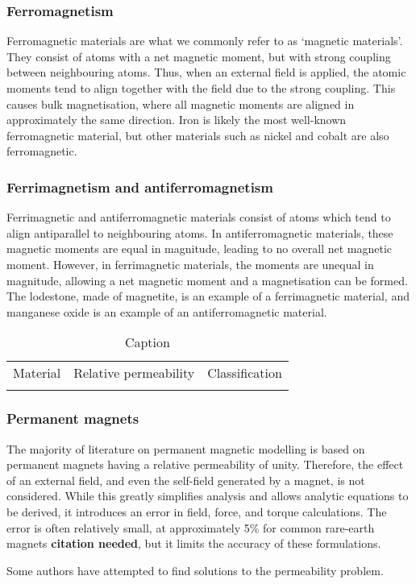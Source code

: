 \subsubsection*{Ferromagnetism}
Ferromagnetic materials are what we commonly refer to as `magnetic materials'. They consist of atoms with a net magnetic moment, but with strong coupling between neighbouring atoms. Thus, when an external field is applied, the atomic moments tend to align together with the field due to the strong coupling. This causes bulk magnetisation, where all magnetic moments are aligned in approximately the same direction. Iron is likely the most well-known ferromagnetic material, but other materials such as nickel and cobalt are also ferromagnetic.

\subsubsection*{Ferrimagnetism and antiferromagnetism}
Ferrimagnetic and antiferromagnetic materials consist of atoms which tend to align antiparallel to neighbouring atoms. In antiferromagnetic materials, these magnetic moments are equal in magnitude, leading to no overall net magnetic moment. However, in ferrimagnetic materials, the moments are unequal in magnitude, allowing a net magnetic moment and a magnetisation can be formed. The lodestone, made of magnetite, is an example of a ferrimagnetic material, and manganese oxide is an example of an antiferromagnetic material.
\begin{table}
    \centering
    \begin{tabular}{c|c|c}
         Material & Relative permeability & Classification \\
         & &
    \end{tabular}
    \caption{Caption}
    \label{tab:my_label}
\end{table}

\subsubsection*{Permanent magnets}
The majority of literature on permanent magnetic modelling is based on permanent magnets having a relative permeability of unity. Therefore, the effect of an external field, and even the self-field generated by a magnet, is not considered. While this greatly simplifies analysis and allows analytic equations to be derived, it introduces an error in field, force, and torque calculations. The error is often relatively small, at approximately 5\% for common rare-earth magnets \textbf{citation needed}, but it limits the accuracy of these formulations.

Some authors have attempted to find solutions to the permeability problem. 

\newpage
\printbibliography[title=References]